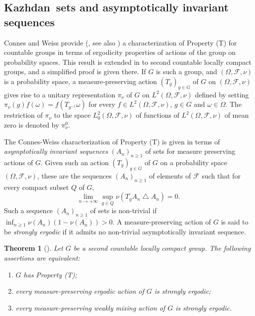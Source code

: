 \documentclass[11pt,english,a4paper]{smfart}
\numberwithin{equation}{section}
\newtheorem{theorem}{Theorem}[section]
\theoremstyle{definition}
\begin{document}
\subsection{{Kazhdan}\ sets and asymptotically invariant sequences}\label{Section 8.2}
Connes and Weiss provide (\!\!\!\cite{CW}, see also \cite{Sch}) a characterization of Property (T) for  countable groups in terms of ergodicity properties of actions of the group on probability spaces. 
This result is extended in \cite[Th.~6.3.4]{BdHV} to second countable locally compact groups, and a simplified proof is given there. 
If $G$ is such a group, and $(\Omega ,\mathcal{F},\nu  )$  is a probability space, a measure-preserving action 
$(T_{g})_{g\in G}$ of $G$ on $(\Omega ,\mathcal{F},\nu  )$ gives rise to a unitary representation $\pi _{\nu }$ of $G$ on $L^{2}(\Omega ,\mathcal{F},\nu  )$ defined by setting 
$\pi _{\nu }(g)f(\omega )=f(T_{g^{-1}}\omega )$ for every $f\in L^{2}(\Omega ,\mathcal{F},\nu  )$, $g\in G$ and $\omega \in \Omega $. The restriction of $\pi _{\nu }$ to the space $L^{2}_{0}(\Omega ,\mathcal{F},\nu  )$ of functions of $L^{2}(\Omega ,\mathcal{F},\nu  )$ of mean zero is denoted by $\pi _{\nu }^{0}$.
\par\smallskip 
The Connes-Weiss characterization of Property (T) is given in terms of \emph{asymptotically invariant sequences} $(A_{n})_{n\ge 1}$ of sets for measure preserving actions of $G$. Given such an action $(T_g)_{g\in G}$ of $G$  on a probability space $(\Omega ,\mathcal{F},\nu  )$, these are the sequences $(A_{n})_{n\ge 1}$ of elements of $\mathcal{F}$ such that for every compact subset ${Q}$ of $G$,
\begin{equation}\label{AS}
 \lim_{n\to+\infty }\sup_{g\in{Q}}\nu (T_g A_{n}\bigtriangleup  A_{n})=0.
\end{equation}
Such a sequence $(A_{n})_{n\ge 1}$ of sets is non-trivial if $\inf_{n\ge 1}\nu (A_{n})(1-\nu (A_{n}))>0$. A measure-preserving action of $G$ is said to be \emph{strongly ergodic} if it admits no non-trivial asymptotically invariant sequence.
\begin{theorem}[\!\!\cite{CW}]\label{OOO} 
 Let $G$ be a second countable locally compact group. The following assertions are equivalent:
\begin{enumerate}
\item[\emph{(a)}] $G$ has Property (T);
\item[\emph{(b)}] every measure-preserving ergodic action of $G$ is strongly ergodic;
\item[\emph{(c)}] every measure-preserving weakly mixing action of $G$ is strongly ergodic.
\end{enumerate}
\end{theorem}
\end{document}

